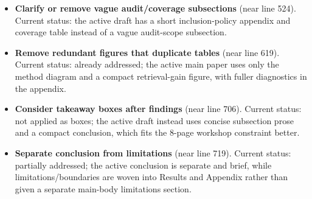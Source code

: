 \begin{itemize}[leftmargin=*]
491). Current action: the active experiment section now names the model
families/sizes in prose and leaves exact route labels to artifacts/appendix.
\item \textbf{Clarify or remove vague audit/coverage subsections} (near line
524). Current status: the active draft has a short inclusion-policy appendix
and coverage table instead of a vague audit-scope subsection.
\item \textbf{Remove redundant figures that duplicate tables} (near line 619).
Current status: already addressed; the active main paper uses only the method
diagram and a compact retrieval-gain figure, with fuller diagnostics in the
appendix.
\item \textbf{Consider takeaway boxes after findings} (near line 706).
Current status: not applied as boxes; the active draft instead uses concise
subsection prose and a compact conclusion, which fits the 8-page workshop
constraint better.
\item \textbf{Separate conclusion from limitations} (near line 719). Current
status: partially addressed; the active conclusion is separate and brief, while
limitations/boundaries are woven into Results and Appendix rather than given a
separate main-body limitations section.
\end{itemize}
